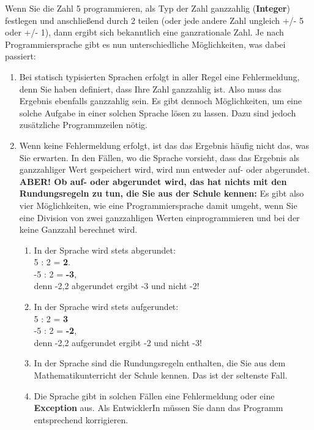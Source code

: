 Wenn Sie die Zahl 5 programmieren, als Typ der Zahl ganzzahlig (\textbf{Integer}) festlegen und anschließend durch 2 teilen (oder jede andere Zahl ungleich +/- 5 oder +/- 1), dann ergibt sich bekanntlich eine ganzrationale Zahl. Je nach Programmiersprache gibt es nun unterschiedliche Möglichkeiten, was dabei passiert:\\

\begin{enumerate}
	\item Bei statisch typisierten Sprachen erfolgt in aller Regel eine Fehlermeldung, denn Sie haben definiert, dass Ihre Zahl ganzzahlig ist. Also muss das Ergebnis ebenfalls ganzzahlig sein. Es gibt dennoch Möglichkeiten, um eine solche Aufgabe in einer solchen Sprache lösen zu lassen. Dazu sind jedoch zusätzliche Programmzeilen nötig.
	
	\item Wenn keine Fehlermeldung erfolgt, ist das das Ergebnis häufig nicht das, was Sie erwarten. In den Fällen, wo die Sprache vorsieht, dass das Ergebnis als ganzzahliger Wert gespeichert wird, wird nun entweder auf- oder abgerundet.\\
	
	\textbf{ABER! Ob auf- oder abgerundet wird, das hat nichts mit den Rundungsregeln zu tun, die Sie aus der Schule kennen:} Es gibt also vier Möglichkeiten, wie eine Programmiersprache damit umgeht, wenn Sie eine Division von zwei ganzzahligen Werten einprogrammieren und bei der keine Ganzzahl berechnet wird.
	
	\begin{enumerate}
		\item In der Sprache wird stets abgerundet: \\
		5 : 2 = \textbf{2}.\\
		-5 : 2 = \textbf{-3},\\
		denn -2,2 abgerundet ergibt -3 und nicht -2!

		\item In der Sprache wird stets aufgerundet:\\
		5 : 2 = \textbf{3}\\
		-5 : 2 = \textbf{-2},\\
		denn -2,2 aufgerundet ergibt -2 und nicht -3!
		
		\item In der Sprache sind die Rundungsregeln enthalten, die Sie aus dem Mathematikunterricht der Schule kennen. Das ist der seltenste Fall.
		
		\item Die Sprache gibt in solchen Fällen eine Fehlermeldung oder eine \textbf{Exception} aus. Als EntwicklerIn müssen Sie dann das Programm entsprechend korrigieren.
		

\end{enumerate}
\end{enumerate}
